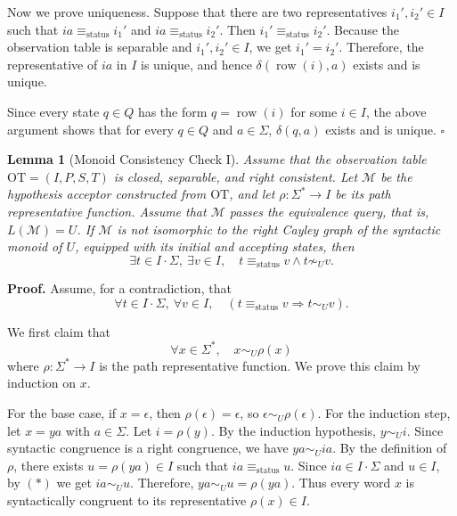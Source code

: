\documentclass{ieice-tecrep}
\newtheorem{lemma}{Lemma}
\begin{document}
Now we prove uniqueness. Suppose that there are two representatives
\(i_1',i_2'\in I\) such that \(ia\equiv_{\mathrm{status}}i_1'\) and \(ia\equiv_{\mathrm{status}}i_2'\). Then \(i_1'\equiv_{\mathrm{status}}i_2'\). Because the observation table is separable and \(i_1',i_2'\in I\), we
get \(i_1'=i_2'\). Therefore, the representative of \(ia\) in \(I\) is unique, and hence \(\delta(\operatorname{row}(i),a)\) exists and is unique.

Since every state \(q\in Q\) has the form \(q=\operatorname{row}(i)\) for some \(i\in I\), the above argument shows that for every \(q\in Q\)
and \(a\in\Sigma\), \(\delta(q,a)\) exists and is unique.
\hfill $\square$

\begin{lemma}[Monoid Consistency Check I]\label{lemma-monoid-consistency-check-i}
Assume that the observation table \(\mathrm{OT}=(I,P,S,T)\) is closed,
separable, and right consistent. Let \(\mathcal{M}\) be the
hypothesis acceptor constructed from \(\mathrm{OT}\), and let
\(\rho:\Sigma^*\to I\) be its path representative function.
Assume that \(\mathcal{M}\) passes the equivalence query, that is,
\(L(\mathcal{M})=U\). If \(\mathcal{M}\) is not isomorphic to the
right Cayley graph of the syntactic monoid of \(U\), equipped with
its initial and accepting states, then
\[
\exists t \in I \cdot \Sigma,\ \exists v \in I,\quad
t \equiv_{\mathrm{status}} v \land t \not\sim_U v.
\]
\end{lemma}
\noindent\textbf{Proof.} Assume, for a contradiction, that
\[
\forall t \in I\cdot\Sigma,\ \forall v\in I,\quad
(t\equiv_{\mathrm{status}}v \Longrightarrow t\sim_U v).
\tag{*}
\]

We first claim that
\[
\forall x\in\Sigma^*,\quad x\sim_U\rho(x)
\]
where \(\rho:\Sigma^*\to I\) is the path representative function. We prove this claim by induction on \(x\).

For the base case, if \(x=\epsilon\), then \(\rho(\epsilon)=\epsilon\),
so \(\epsilon\sim_U\rho(\epsilon)\). For the induction step, let \(x=ya\) with \(a\in\Sigma\). Let \(i=\rho(y)\). By the induction hypothesis, \(y\sim_U i\). Since syntactic congruence is a right congruence, we have \(ya\sim_U ia\). By the definition of \(\rho\), there exists \(u=\rho(ya)\in I\) such
that \(ia\equiv_{\mathrm{status}}u\). Since \(ia\in I\cdot\Sigma\) and \(u\in I\), by \((*)\) we get \(ia\sim_U u\). Therefore, \(ya \sim_U u=\rho(ya)\). Thus every word \(x\) is syntactically congruent to its representative
\(\rho(x)\in I\).
\end{document}
